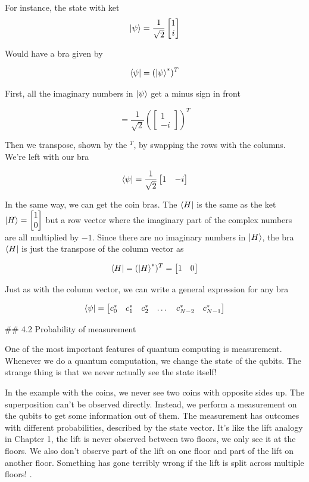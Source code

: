 \documentclass{book}
\begin{document}
For instance, the state with ket
$$\ket{\psi} = \frac{1}{\sqrt{2}} \begin{bmatrix} 1 \\ i \end{bmatrix} $$

Would have a bra given by 

$$
\bra{\psi} = (\ket{\psi}^*)^T 
$$

First, all the imaginary numbers in $\ket{\psi}$ get a minus sign in front 

 $$= \frac{1}{\sqrt{2}} \left(\begin{bmatrix} 1 \\ -i \end{bmatrix} \right)^T $$

Then we transpose, shown by the $^T$, by swapping the rows with the columns. We're left with our bra

$$\bra{\psi} = \frac{1}{\sqrt{2}} \begin{bmatrix} 1 & -i \end{bmatrix} $$


In the same way, we can get the coin bras. The $\bra{H}$ is the same as the ket $\ket{H} = \begin{bmatrix} 1 \\ 0 \end{bmatrix}$ but a row vector where the imaginary part of the complex numbers are all multiplied by $-1$. Since there are no imaginary numbers in $\ket{H}$, the bra $\bra{H}$ is just the transpose of the column vector as

$$
\bra{H} = (\ket{H}^*)^T = \begin{bmatrix} 1 & 0 \end{bmatrix}
$$

Just as with the column vector, we can write a general expression for any bra

$$
\bra{\psi} = \begin{bmatrix} c_0^* & c_1^* & c_2^* & \dots & c_{N-2}^* & c_{N-1}^* \end{bmatrix}
$$


## 4.2 Probability of measurement


One of the most important features of quantum computing is measurement. Whenever we do a quantum computation, we change the state of the qubits. The strange thing is that we never actually see the state itself! 

In the example with the coins, we never see two coins with opposite sides up. The superposition can't be observed directly. Instead, we perform a measurement on the qubits to get some information out of them. The measurement has outcomes with different probabilities, described by the state vector. It's like the lift analogy in Chapter 1, the lift is never observed between two floors, we only see it at the floors. We also don't observe part of the lift on one floor and part of the lift on another floor. Something has gone terribly wrong if the lift is split across multiple floors! 
. 
\end{document}
